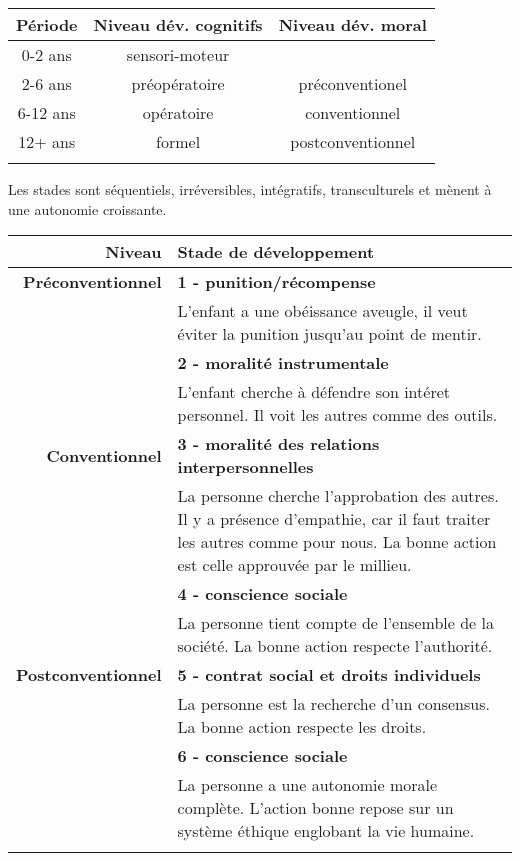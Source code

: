 \documentclass[11pt]{article}
\begin{document}
\begin{center}
\begin{tabular}{@{}ccc@{}}
\hline
  \textbf{Période}
& \textbf{Niveau dév. cognitifs}
& \textbf{Niveau dév. moral}\\
\hline
  0-2 ans
& sensori-moteur
& \\
  2-6 ans
& préopératoire
& préconventionel\\
  6-12 ans
& opératoire
& conventionnel\\
  12+ ans
& formel
& postconventionnel\\
\hline\\
\end{tabular}
\end{center}

Les stades sont séquentiels, irréversibles, intégratifs, transculturels et mènent à une autonomie croissante.\\

\begin{center}
\begin{tabularx}{\textwidth}{@{}rX@{}}
\hline
  \textbf{Niveau}
& \textbf{Stade de développement}\\
\hline
  \textbf{Préconventionnel}
& \textbf{1 - punition/récompense}\\
& L'enfant a une obéissance aveugle, il veut éviter la punition jusqu'au point de mentir.\\
& \textbf{2 - moralité instrumentale}\\
& L'enfant cherche à défendre son intéret personnel. Il voit les autres comme des outils.\\
  \textbf{Conventionnel}
& \textbf{3 - moralité des relations interpersonnelles}\\
& La personne cherche l'approbation des autres. Il y a présence d'empathie, car il faut traiter les autres comme pour nous. La bonne action est celle approuvée par le millieu.\\
& \textbf{4 - conscience sociale}\\
& La personne tient compte de l'ensemble de la société. La bonne action respecte l'authorité.\\
  \textbf{Postconventionnel}
& \textbf{5 - contrat social et droits individuels}\\
& La personne est la recherche d'un consensus. La bonne action respecte les droits.\\
& \textbf{6 - conscience sociale}\\
& La personne a une autonomie morale complète. L'action bonne repose sur un système éthique englobant la vie humaine.\\
\hline\\
\end{tabularx}
\end{center}
\end{document}
